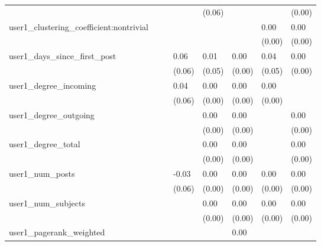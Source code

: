 \begin{table}
\begin{center}
\begin{tabular}{llllllll}
                                               &          &            &         & (0.06)  &          &             & (0.00)   \\
user1_clustering_coefficient:nontrivial        &          &            &         &         &          & 0.00        & 0.00     \\
                                               &          &            &         &         &          & (0.00)      & (0.00)   \\
user1_days_since_first_post                    &          &            & 0.06    & 0.01    & 0.00     & 0.04        & 0.00     \\
                                               &          &            & (0.06)  & (0.05)  & (0.00)   & (0.05)      & (0.00)   \\
user1_degree_incoming                          &          &            & 0.04    & 0.00    & 0.00     & 0.00        &          \\
                                               &          &            & (0.06)  & (0.00)  & (0.00)   & (0.00)      &          \\
user1_degree_outgoing                          &          &            &         & 0.00    & 0.00     &             & 0.00     \\
                                               &          &            &         & (0.00)  & (0.00)   &             & (0.00)   \\
user1_degree_total                             &          &            &         & 0.00    & 0.00     &             & 0.00     \\
                                               &          &            &         & (0.00)  & (0.00)   &             & (0.00)   \\
user1_num_posts                                &          &            & -0.03   & 0.00    & 0.00     & 0.00        & 0.00     \\
                                               &          &            & (0.06)  & (0.00)  & (0.00)   & (0.00)      & (0.00)   \\
user1_num_subjects                             &          &            &         & 0.00    & 0.00     & 0.00        & 0.00     \\
                                               &          &            &         & (0.00)  & (0.00)   & (0.00)      & (0.00)   \\
user1_pagerank_weighted                        &          &            &         &         & 0.00     &             &          \\

\end{tabular}
\end{center}
\end{table}
